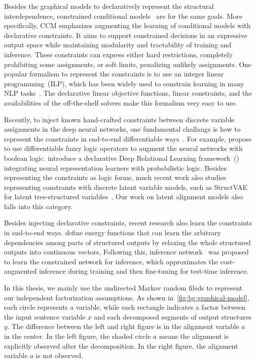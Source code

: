  Besides the graphical
models to declaratively represent the structural interdependence, constrained conditional
models~\citep[CCM,][]{chang2012structured} are for the same goals. More specifically, CCM
emphasizes augmenting the learning of conditional models with
declarative constraints. It aims to support constrained decisions in
an expressive output space while maintaining modularity and
tractability of training and inference. These constraints can express
either hard restrictions, completely prohibiting some assignments, or
soft limits, penalizing unlikely assignments. One popular
formalism to represent the constraints is to use an integer linear
programming~(ILP), which has been widely used to constrain learning in
many NLP tasks~\citep{roth2007global}. The declarative linear
objective functions, linear constraints, and the availabilities of
the off-the-shelf solvers make this formalism very easy to use.

 Recently, to inject
known hand-crafted constraints between discrete variable assignments
in the deep neural networks, one fundamental challange is how to
represent the constraints in end-to-end differentiable
ways~\citep{bach2017hinge}. For example, \citet{li2019augmenting}
propose to use differentiable fuzzy logic operators to augment the
neural networks with boolean logic. \citet{pacheco2021modeling}
introduce a declarative Deep Relational Learning framework~(\DRAIL)
integrating neural representation learners with probabilistic
logic. Besides representing the constraints as logic forms, much
recent work also studies representing constraints with discrete latent
variable models, such as StructVAE for latent tree-structured
variables~\citep{yin2018structvae, corro2019learning}. Our work on
latent alignment models also falls into this category.

 Besides injecting
declarative constraints, recent research also learn the constraints in
end-to-end ways. \citet[SPEN,][]{belanger2016structured} define
energy functions that can learn the arbitrary dependencies among parts
of structured outputs by relaxing the whole structured outputs into
continuous vectors, Following this, inference
network~\citep{tu2018learning} was proposed to learn the constrained
network for inference, which approximates the cost-augmented inference
during training and then fine-tuning for test-time inference.

 In this thesis, we mainly use
the undirected Markov random fileds to represent our independent
factorization assumptions. As shown
in~\autoref{fig:bg:graphical-model}, each circle represents a
variable, while each rectangle indicates a factor between the input
sentence variable $x$ and each decomposed segments of output
structures $y$. The difference between the left and right figure is in
the alignment variable $a$ in the center. In the left figure, the
shaded circle $a$ means the alignment is explicitly observed after the
decomposition. In the right figure, the alignment variable $a$ is not
observed.


